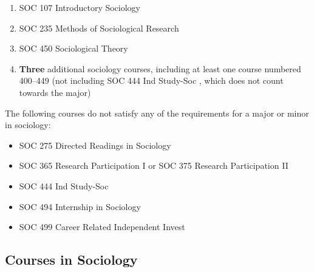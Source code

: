 \documentclass[
  letterpaper,
]{scrbook}
\providecommand{\tightlist}{%
  \setlength{\itemsep}{0pt}\setlength{\parskip}{0pt}}
\begin{document}
\begin{enumerate}
\def\labelenumi{\arabic{enumi}.}
\item
  SOC 107 Introductory Sociology
\item
  SOC 235 Methods of Sociological Research
\item
  SOC 450 Sociological Theory
\item
  \textbf{Three} additional sociology courses, including at least one
  course numbered 400--449 (not including SOC 444 Ind Study-Soc , which
  does not count towards the major)
\end{enumerate}

The following courses do not satisfy any of the requirements for a major
or minor in sociology:

\begin{itemize}
\tightlist
\item
  SOC 275 Directed Readings in Sociology
\item
  SOC 365 Research Participation I or SOC 375 Research Participation II
\item
  SOC 444 Ind Study-Soc
\item
  SOC 494 Internship in Sociology
\item
  SOC 499 Career Related Independent Invest
\end{itemize}

\subsection{Courses in Sociology}\label{courses-in-sociology}
\end{document}
